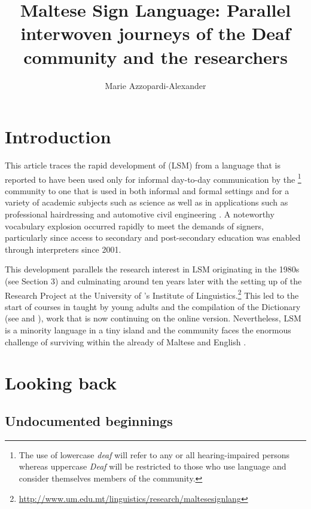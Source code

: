 \documentclass[output=paper]{langsci/langscibook}
\author{Marie Azzopardi-Alexander\affiliation{Institute of Linguistics, University of Malta}}
\title{Maltese Sign Language: Parallel interwoven journeys of the Deaf community and the researchers}
\begin{document}
 
\section{Introduction}
This article traces the rapid development of 
(LSM) from a language that is reported to have been used only for
informal day-to-day communication by the \footnote{The use of
  lowercase \textit{deaf} will refer to any or all hearing-impaired persons
  whereas uppercase \textit{Deaf} will be restricted to those who use 
  language and consider themselves members of the  community.}
community \citep[7]{lj86} to one that is used in
both informal and formal settings and for a variety of academic
subjects such as science as well as in applications such as
professional hairdressing and automotive civil engineering
\citep[55 ff]{aa15}.  A noteworthy vocabulary
explosion occurred rapidly to meet the demands of signers,
particularly since access to secondary and post-secondary education
was enabled through  interpreters since 2001.

This development parallels the research interest in LSM originating in
the 1980s (see Section 3) and culminating around ten years later with
the setting up of the  Research Project at the
University of ’s Institute of
Linguistics.\footnote{\url{http://www.um.edu.mt/linguistics/research/maltesesignlang}}
This led to the start of courses in  taught by
young  adults and the compilation of the 
Dictionary (see \citealt{a03} and \citealt{a04}), work that
is now continuing on the online version. Nevertheless, LSM is a
minority language in a tiny island and the  community faces the
enormous challenge of surviving within the already 
of Maltese and English \citep[52]{aa15}.

\section{Looking back} 

\subsection{Undocumented beginnings}
\end{document}
